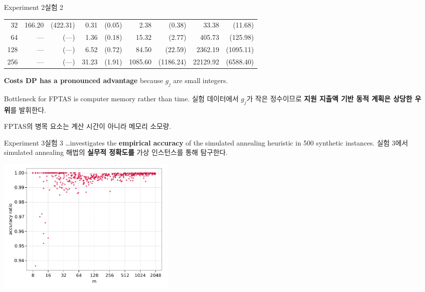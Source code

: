\documentclass[11pt,mathserif,notheorems]{beamer}
\theoremstyle{definition}
\theoremstyle{definition}
\begin{document}
\begin{frame}{\ifen Experiment 2\else 실험 2\fi}
\begin{center}
{\begin{tabular}{r|r@{~}r|r@{~}r|r@{~}r|r@{~}r}
    32 &        166.20 &     (422.31) &         0.31 &      (0.05) &                2.38 &             (0.38) &                33.38 &             (11.68) \\
    64 &             — &          (—) &         1.36 &      (0.18) &               15.32 &             (2.77) &               405.73 &            (125.98) \\
   128 &             — &          (—) &         6.52 &      (0.72) &               84.50 &            (22.59) &              2362.19 &           (1095.11) \\
   256 &             — &          (—) &        31.23 &      (1.91) &             1085.60 &          (1186.24) &             22129.92 &           (6588.40)
\end{tabular}
}
\end{center}
\ifen 
\textbf{Costs DP has a pronounced advantage} because $g_j$ are small integers.

Bottleneck for FPTAS is computer memory rather than time. 
\else
실험 데이터에서 $g_j$가 작은 정수이므로 \textbf{지원 지출액 기반 동적 계획은 상당한 우위}를 발휘한다. 

FPTAS의 병목 요소는 계산 시간이 아니라 메모리 소모량.
\fi

\end{frame}





\begin{frame}{\ifen Experiment 3\else 실험 3\fi}
\ifen
\dots investigates the \textbf{empirical accuracy} of the simulated annealing heuristic in 500 synthetic instances.
\else
실험 3에서 simulated annealing 해법의 \textbf{실무적 정확도를} 가상 인스턴스를 통해 탐구한다.
\fi
\begin{center}
 \includegraphics[height=18em]{./plots/accuracy_simulatedannealing.pdf}
\end{center}
\end{frame}
\end{document}
